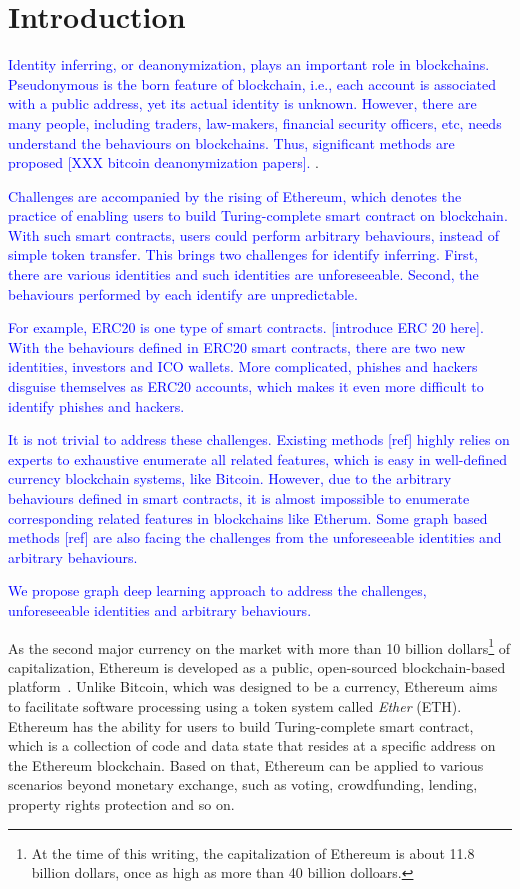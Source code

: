 \section{Introduction}

\textcolor{blue}{Identity inferring, or deanonymization, plays an important role
in blockchains. Pseudonymous is the born feature of
blockchain, i.e., each account is associated with a public address, yet its
actual identity is unknown. However, there are many people, including traders,
law-makers, financial security officers, etc, needs understand the behaviours on
blockchains. Thus, significant methods are proposed [XXX bitcoin deanonymization
papers]. }.

\textcolor{blue}{
Challenges are accompanied by the rising of Ethereum, which denotes the
practice of enabling users to build Turing-complete smart contract on
blockchain. With such smart contracts, users could perform arbitrary
behaviours, instead of simple token transfer. This brings two challenges for
identify inferring.
First, there are various identities and such identities are unforeseeable.
Second, the behaviours performed by each identify are unpredictable.
}

\textcolor{blue}{
For example, ERC20 is one type of smart contracts. [introduce ERC 20 here].
With the behaviours defined in ERC20 smart contracts, there are two new
identities, investors and ICO wallets. More complicated, phishes and hackers
disguise themselves as ERC20 accounts, which makes it even more difficult to
identify phishes and hackers.
}


\textcolor{blue}{
It is not trivial to address these challenges. Existing methods [ref] highly
relies on experts to exhaustive enumerate all related features, which is easy
in well-defined currency blockchain systems, like Bitcoin. However, due to the arbitrary behaviours
defined in smart contracts, it is
almost impossible to enumerate corresponding related features in blockchains
like Etherum. Some graph based methods [ref] are also facing the challenges from
the unforeseeable identities and arbitrary behaviours.
}


\textcolor{blue}{
  We propose graph deep learning approach to address the challenges,
  unforeseeable identities and arbitrary behaviours.
}

As the second major currency on the market with more than 10 billion dollars\footnote{At the time of this writing, the capitalization of Ethereum is about 11.8 billion dollars, once as high as more than 40 billion dolloars.} of capitalization, Ethereum is developed as a public, open-sourced blockchain-based platform~\cite{buterin2013ethereum}. Unlike Bitcoin, which was designed to be a currency, Ethereum aims to facilitate software processing using a token system called \emph{Ether} (ETH). Ethereum has the ability for users to build Turing-complete smart contract, which is a collection of code and data state that resides at a specific address on the Ethereum blockchain. Based on that, Ethereum can be applied to various scenarios beyond monetary exchange, such as voting, crowdfunding, lending, property rights protection and so on.

